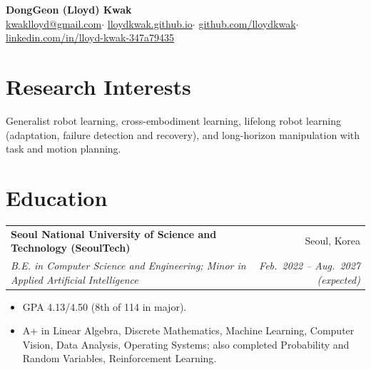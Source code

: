 \documentclass[10.5pt,a4paper]{article}
\makeatletter
\newcommand{\entry}[4]{%
  \begin{tabularx}{\textwidth}{@{}X@{\hspace{6pt}}r@{}}
    \textbf{#1} & #2\\[-1pt]
    \textit{#3} & \textit{#4}
  \end{tabularx}\vspace{-2pt}}
\makeatother
\begin{document}
\begin{center}
  {\fontsize{22}{26}\selectfont\bfseries DongGeon (Lloyd) Kwak}\\[5pt]
  {\small
  \href{mailto:kwaklloyd@gmail.com}{kwaklloyd@gmail.com}\enspace$\cdot$\enspace
  \href{https://lloydkwak.github.io}{lloydkwak.github.io}\enspace$\cdot$\enspace
  \href{https://github.com/lloydkwak}{github.com/lloydkwak}\enspace$\cdot$\enspace
  \href{https://www.linkedin.com/in/lloyd-kwak-347a79435}{linkedin.com/in/lloyd-kwak-347a79435}}
\end{center}
\vspace{-2pt}

\section{Research Interests}
Generalist robot learning, cross-embodiment learning, lifelong robot learning (adaptation, failure detection and recovery), and long-horizon manipulation with task and motion planning.

\section{Education}
\entry{Seoul National University of Science and Technology (SeoulTech)}{Seoul, Korea}
      {B.E. in Computer Science and Engineering; Minor in Applied Artificial Intelligence}{Feb.\ 2022 -- Aug.\ 2027 (expected)}
\begin{itemize}
  \item GPA 4.13/4.50 (8th of 114 in major).
  \item A+ in Linear Algebra, Discrete Mathematics, Machine Learning, Computer Vision, Data Analysis, Operating Systems; also completed Probability and Random Variables, Reinforcement Learning.
\end{itemize}
\end{document}
